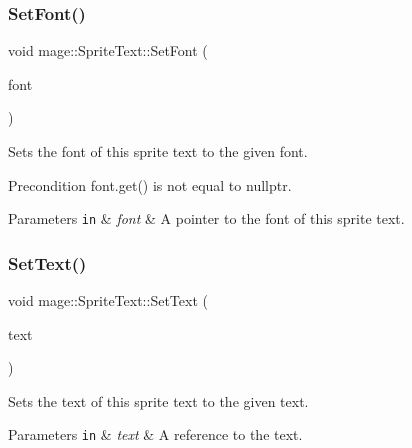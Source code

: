 \subsubsection{\texorpdfstring{Set\+Font()}{SetFont()}}
{\footnotesize\ttfamily void mage\+::\+Sprite\+Text\+::\+Set\+Font (\begin{DoxyParamCaption}\item[{\hyperlink{namespacemage_a1e01ae66713838a7a67d30e44c67703e}{Shared\+Ptr}$<$ const \hyperlink{classmage_1_1_sprite_font}{Sprite\+Font} $>$}]{font }\end{DoxyParamCaption})}

Sets the font of this sprite text to the given font.

\begin{DoxyPrecond}{Precondition}
{\ttfamily font.\+get()} is not equal to {\ttfamily nullptr}. 
\end{DoxyPrecond}

\begin{DoxyParams}[1]{Parameters}
\mbox{\tt in}  & {\em font} & A pointer to the font of this sprite text. \\
\hline
\end{DoxyParams}
\hypertarget{classmage_1_1_sprite_text_ac33e512ab29554a306ada9a378ab00eb}{}\label{classmage_1_1_sprite_text_ac33e512ab29554a306ada9a378ab00eb} 
\subsubsection{\texorpdfstring{Set\+Text()}{SetText()}\hspace{0.1cm}{\footnotesize\ttfamily [1/3]}}
{\footnotesize\ttfamily void mage\+::\+Sprite\+Text\+::\+Set\+Text (\begin{DoxyParamCaption}\item[{const wstring \&}]{text }\end{DoxyParamCaption})}

Sets the text of this sprite text to the given text.


\begin{DoxyParams}[1]{Parameters}
\mbox{\tt in}  & {\em text} & A reference to the text. \\
\hline
\end{DoxyParams}
\hypertarget{classmage_1_1_sprite_text_a03d5012e2812d422a1285a4a0abb104f}{}\label{classmage_1_1_sprite_text_a03d5012e2812d422a1285a4a0abb104f} 
